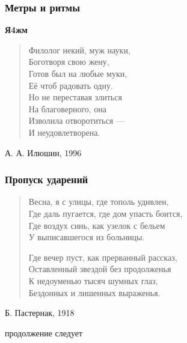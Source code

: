 \documentclass{beamer}
\begin{document}
\begin{frame}
\frametitle{Метры и ритмы}

\textbf{Я4жм}
\begin{verse}
Филолог некий, муж науки,\\
Боготворя свою жену,\\
Готов был на любые муки,\\
Её чтоб радовать одну.\\
Но не переставая злиться\\
На благоверного, она\\
Изволила отворотиться —\\
И неудовлетворена.
\end{verse}

А. А. Илюшин, 1996

\end{frame}


\begin{frame}
\frametitle{Пропуск ударений}

\begin{verse}
Весна, я с улицы, где тополь удивлен, \\
Где даль пугается, где дом упасть боится,\\ 
Где воздух синь, как узелок с бельем \\
\alert{У выписавшегося из больницы}. 

Где вечер пуст, как прерванный рассказ,\\ 
Оставленный звездой без продолженья \\
К недоуменью тысяч шумных глаз, \\
Бездонных и лишенных выраженья. 
\end{verse}

Б. Пастернак, 1918

\end{frame}




\begin{frame}
\Huge{\centerline{продолжение следует}}
\end{frame}
\end{document}
